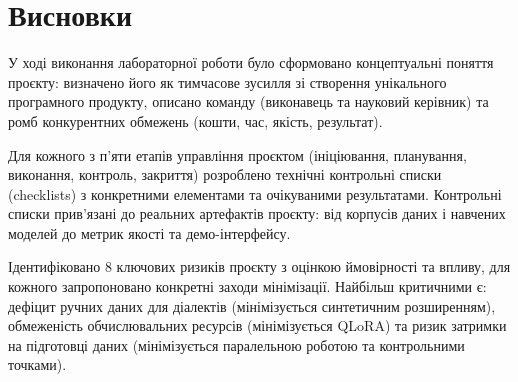 \documentclass[14pt]{extarticle}
\begin{document}
\section*{Висновки}

У ході виконання лабораторної роботи було сформовано концептуальні поняття проєкту: визначено його як тимчасове зусилля зі створення унікального програмного продукту, описано команду (виконавець та науковий керівник) та ромб конкурентних обмежень (кошти, час, якість, результат).

Для кожного з п'яти етапів управління проєктом (ініціювання, планування, виконання, контроль, закриття) розроблено технічні контрольні списки (checklists) з конкретними елементами та очікуваними результатами. Контрольні списки прив'язані до реальних артефактів проєкту: від корпусів даних і навчених моделей до метрик якості та демо-інтерфейсу.

Ідентифіковано 8 ключових ризиків проєкту з оцінкою ймовірності та впливу, для кожного запропоновано конкретні заходи мінімізації. Найбільш критичними є: дефіцит ручних даних для діалектів (мінімізується синтетичним розширенням), обмеженість обчислювальних ресурсів (мінімізується QLoRA) та ризик затримки на підготовці даних (мінімізується паралельною роботою та контрольними точками).
\end{document}
